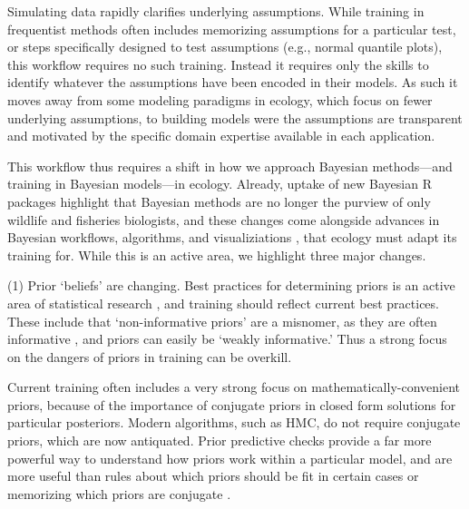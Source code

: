 \documentclass[11pt]{article}
\begin{document}
{Simulating data rapidly clarifies underlying assumptions. While training in frequentist methods often includes memorizing assumptions for a particular test, or steps specifically designed to test assumptions (e.g., normal quantile plots), this workflow requires no such training. Instead it requires only the skills to identify whatever the assumptions have been encoded in their
models. As such it moves away from some modeling paradigms in ecology, which focus on fewer underlying assumptions, to
building models were the assumptions are transparent and motivated by the specific domain expertise available in each
application. %


This workflow thus requires a shift in how we approach Bayesian methods---and training in Bayesian models---in ecology. Already, uptake of new Bayesian \textsf{R} packages highlight that Bayesian methods are no longer the purview of only wildlife and fisheries biologists, and these changes come alongside advances in Bayesian workflows, algorithms, and visualiziations \citep[e.g.][]{betanworkflow,vandeschoot2021,gabryvis}, that ecology must adapt its training for. While this is an active area, we highlight three major changes.

(1) Prior `beliefs' are changing. Best practices for determining priors is an active area of statistical research \citep{BDA,regotherstories,betanprior}, and training should reflect current best practices. These include that `non-informative priors' are a misnomer, as they are often informative  \citep{lemoine2019}, and priors can easily be `weakly informative.' Thus a strong focus on the dangers of priors in training can be overkill. %

Current training often includes a very strong focus on mathematically-convenient priors, because of the importance of conjugate priors in closed form solutions for particular posteriors. Modern algorithms, such as HMC, do not require conjugate priors, which are now antiquated. Prior predictive checks provide a far more powerful way to understand how priors work within a particular model, and are more useful than rules about which priors should be fit in certain cases or memorizing which priors are conjugate \citep{betanprior}. %

}
\end{document}
